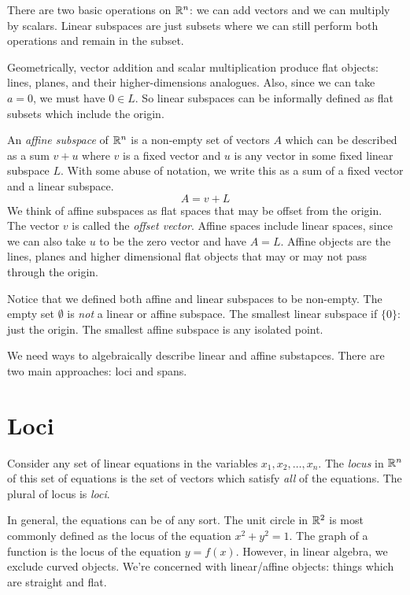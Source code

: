 \documentclass[fleqn]{report}
\begin{document}
There are two basic operations on $\mathbb{R}^n$:
we can add vectors and we can multiply by scalars. Linear
subspaces are just subsets where we can still perform both
operations and remain in the subset.

Geometrically, vector addition and scalar multiplication
produce flat objects: lines, planes, and their
higher-dimensions analogues. Also, since we can take
$a=0$, we must have $0 \in L$. So linear subspaces can be
informally defined as flat subsets which include the origin.

\begin{defn}
An \emph{affine subspace} of $\mathbb{R}^n$ is a non-empty set of
vectors $A$ which can be described as a sum $v+u$ where $v$ is
a fixed vector and $u$ is any vector in some fixed linear
subspace $L$. With some abuse of notation, we write this as a
sum of a fixed vector and a linear subspace.
\begin{equation*}
A = v + L
\end{equation*}
We think of affine subspaces as flat spaces that
may be offset from the origin. The vector $v$ is called the
\emph{offset vector}. Affine spaces include linear spaces,
since we can also take $u$ to be the zero vector and have
$A=L$. Affine objects are the lines, planes and higher
dimensional flat objects that may or may not pass through the
origin.
\end{defn}

Notice that we defined both affine and linear subspaces to be
non-empty. The empty set $\emptyset$ is \emph{not} a linear or
affine subspace. The smallest linear subspace if $\{0\}$: just
the origin. The smallest affine subspace is any isolated
point.

We need ways to algebraically describe linear and affine
substapces. There are two main approaches: loci and spans.

\section{Loci}

\begin{defn}
Consider any set of linear equations in the variables
$x_1, x_2, \ldots, x_n$. The \emph{locus} in $\mathbb{R}^n$ of this
set of equations is the set of vectors which satisfy
\emph{all} of the equations. The plural of locus is
\emph{loci}.
\end{defn}

In general, the equations can be of any sort. The unit circle
in $\mathbb{R}^2$ is most commonly defined as the locus of the equation
$x^2 + y^2 = 1$. The graph of a function is the locus of the
equation $y = f(x)$. However, in linear algebra, 
we exclude curved objects. We're concerned with
linear/affine objects: things which are straight and flat.
\end{document}

